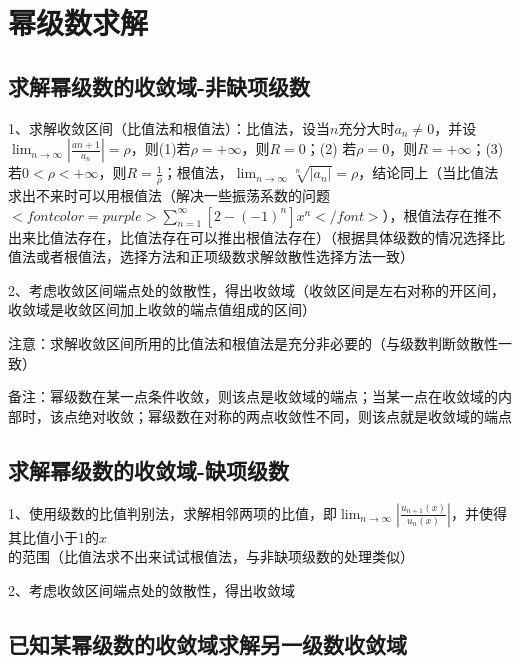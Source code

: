 \section{幂级数求解}



\subsection{求解幂级数的收敛域-非缺项级数}

1、求解收敛区间（比值法和根值法）：比值法，设当$ n $充分大时$ a_{n} \neq 0 $，并设$ \lim_{n \rightarrow \infty}\left|\frac{a{n+1}}{a_{n}}\right|=\rho $，则(1)若$ \rho=+\infty $，则$ R=0 $；(2) 若$ \rho=0 $，则$ R=+\infty $；(3) 若$ 0<\rho<+\infty $，则$ R=\frac{1}{\rho} $；根值法，$ \lim_{n \rightarrow \infty} \sqrt[n]{\mid a_{n} |}=\rho $，结论同上（当比值法求出不来时可以用根值法（解决一些振荡系数的问题$ <font color=purple>\sum_{n=1}^{\infty}\left[2-(-1)^{n}\right] x^{n}</font> $），根值法存在推不出来比值法存在，比值法存在可以推出根值法存在）（根据具体级数的情况选择比值法或者根值法，选择方法和正项级数求解敛散性选择方法一致）

2、考虑收敛区间端点处的敛散性，得出收敛域（收敛区间是左右对称的开区间，收敛域是收敛区间加上收敛的端点值组成的区间）

注意：求解收敛区间所用的比值法和根值法是充分非必要的（与级数判断敛散性一致）

备注：幂级数在某一点条件收敛，则该点是收敛域的端点；当某一点在收敛域的内部时，该点绝对收敛；幂级数在对称的两点收敛性不同，则该点就是收敛域的端点



\subsection{求解幂级数的收敛域-缺项级数}

1、使用级数的比值判别法，求解相邻两项的比值，即$ \lim _{n \rightarrow \infty}\left|\frac{u_{n+1}(x)}{u_{n}(x)}\right| $，并使得其比值小于1的$ x $的范围（比值法求不出来试试根值法，与非缺项级数的处理类似）

2、考虑收敛区间端点处的敛散性，得出收敛域



\subsection{已知某幂级数的收敛域求解另一级数收敛域}

